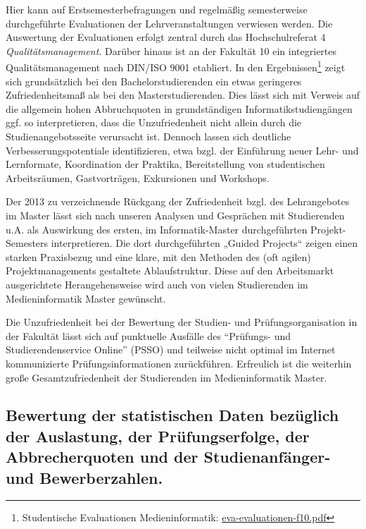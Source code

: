 Hier kann auf Erstsemesterbefragungen und regelmäßig semesterweise
durchgeführte Evaluationen der Lehrveranstaltungen verwiesen werden. Die
Auswertung der Evaluationen erfolgt zentral durch das Hochschulreferat 4
\emph{Qualitätsmanagement}. Darüber hinaus ist an der Fakultät 10 ein
integriertes Qualitätsmanagement nach DIN/ISO 9001 etabliert. In den
Ergebnissen\footnote{Studentische Evaluationen Medieninformatik:
  \href{../anhaenge/eva-evaluationen-f10.pdf}{eva-evaluationen-f10.pdf}}
zeigt sich grundsätzlich bei den Bachelorstudierenden ein etwas
geringeres Zufriedenheitsmaß als bei den Masterstudierenden. Dies lässt
sich mit Verweis auf die allgemein hohen Abbruchquoten in grundständigen
Informatikstudiengängen ggf. so interpretieren, dass die Unzufriedenheit
nicht allein durch die Studienangebotsseite verursacht ist. Dennoch
lassen sich deutliche Verbesserungspotentiale identifizieren, etwa bzgl.
der Einführung neuer Lehr- und Lernformate, Koordination der Praktika,
Bereitstellung von studentischen Arbeitsräumen, Gastvorträgen,
Exkursionen und Workshops.

Der 2013 zu verzeichnende Rückgang der Zufriedenheit bzgl. des
Lehrangebotes im Master lässt sich nach unseren Analysen und Gesprächen
mit Studierenden u.A. als Auswirkung des ersten, im Informatik-Master
durchgeführten Projekt-Semesters interpretieren. Die dort durchgeführten
„Guided Projects`` zeigen einen starken Praxisbezug und eine klare, mit
den Methoden des (oft agilen) Projektmanagements gestaltete
Ablaufstruktur. Diese auf den Arbeitsmarkt ausgerichtete
Herangehensweise wird auch von vielen Studierenden im Medieninformatik
Master gewünscht.

Die Unzufriedenheit bei der Bewertung der Studien- und
Prüfungsorganisation in der Fakultät lässt sich auf punktuelle Ausfälle
des ``Prüfungs- und Studierendenservice Online'' (PSSO) und teilweise
nicht optimal im Internet kommunizierte Prüfungsinformationen
zurückführen. Erfreulich ist die weiterhin große Gesamtzufriedenheit der
Studierenden im Medieninformatik Master.

\subsection{Bewertung der statistischen Daten bezüglich der
Auslastung, der Prüfungserfolge, der Abbrecherquoten und der
Studienanfänger- und
Bewerberzahlen.}\label{bewertung-der-statistischen-daten-bezuxfcglich-der-auslastung-der-pruxfcfungserfolge-der-abbrecherquoten-und-der-studienanfuxe4nger--und-bewerberzahlen.}

